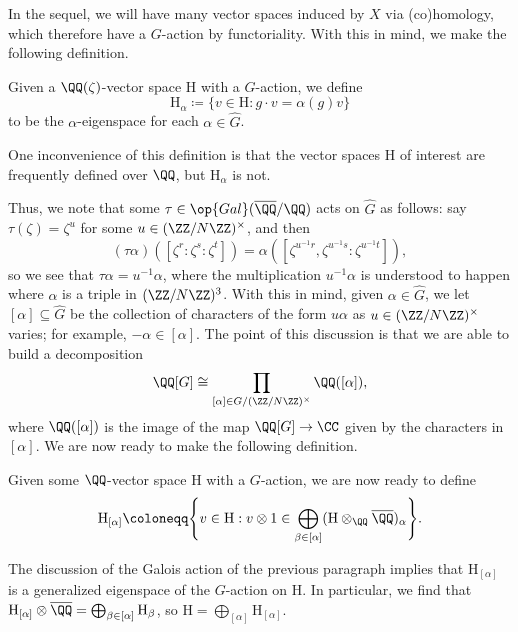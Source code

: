 \documentclass[../thesis.tex]{subfiles}
\begin{document}
In the sequel, we will have many vector spaces induced by $X$ via (co)homology, which therefore have a $G$-action by functoriality. With this in mind, we make the following definition.
\begin{definition}
	Given a $\QQ(\zeta)$-vector space $\mathrm{H}$ with a $G$-action, we define
	\[\mathrm{H}_\alpha\coloneqq\{v\in\mathrm{H}:g\cdot v=\alpha(g)v\}\]
	to be the $\alpha$-eigenspace for each $\alpha\in\widehat G$.
\end{definition}
One inconvenience of this definition is that the vector spaces $\mathrm H$ of interest are frequently defined over $\QQ$, but $\mathrm{H}_\alpha$ is not.

Thus, we note that some $\tau\in\op{Gal}(\overline\QQ/\QQ)$ acts on $\widehat G$ as follows: say $\tau(\zeta)=\zeta^u$ for some $u\in(\ZZ/N\ZZ)^\times$, and then
\[(\tau\alpha)([\zeta^r:\zeta^s:\zeta^t])=\alpha\left([\zeta^{u^{-1}r},\zeta^{u^{-1}s}:\zeta^{u^{-1}t}]\right),\]
so we see that $\tau\alpha=u^{-1}\alpha$, where the multiplication $u^{-1}\alpha$ is understood to happen where $\alpha$ is a triple in $(\ZZ/N\ZZ)^3$. With this in mind, given $\alpha\in\widehat G$, we let $[\alpha]\subseteq\widehat G$ be the collection of characters of the form $u\alpha$ as $u\in(\ZZ/N\ZZ)^\times$ varies; for example, $-\alpha\in[\alpha]$. The point of this discussion is that we are able to build a decomposition
\[\QQ[G]\cong\prod_{[\alpha]\in G/(\ZZ/N\ZZ)^\times}\QQ([\alpha]),\]
where $\QQ([\alpha])$ is the image of the map $\QQ[G]\to\CC$ given by the characters in $[\alpha]$. We are now ready to make the following definition.
\begin{definition}
	Given some $\QQ$-vector space $\mathrm H$ with a $G$-action, we are now ready to define
	\[\mathrm H_{[\alpha]}\coloneqq\Bigg\{v\in\mathrm H:v\otimes1\in\bigoplus_{\beta\in[\alpha]}(\mathrm H\otimes_\QQ\overline\QQ)_\alpha\Bigg\}.\]
\end{definition}
The discussion of the Galois action of the previous paragraph implies that $\mathrm H_{[\alpha]}$ is a generalized eigenspace of the $G$-action on $\mathrm H$. In particular, we find that $\mathrm H_{[\alpha]}\otimes\overline\QQ=\bigoplus_{\beta\in[\alpha]}\mathrm H_\beta$, so $\mathrm H=\bigoplus_{[\alpha]}\mathrm H_{[\alpha]}$.
\end{document}

